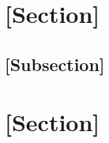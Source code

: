\documentclass[11pt,letterpaper]{article}
\begin{document}
\maketitleblock

\section{[Section]}
\label{sec:first}

\subsection{[Subsection]}



\section{[Section]}
\label{sec:second}

\printbibliography[title={References}]
\end{document}
